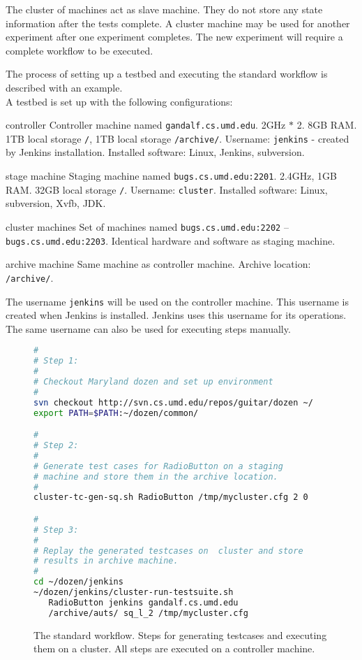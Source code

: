 The cluster of machines act as slave machine. They do not store any state information after the tests complete. A cluster machine may be used for another experiment after one experiment completes. The new experiment will require a complete workflow to be executed.

The process of setting up a testbed and executing the standard workflow is described with an example.\\

\noindent A testbed is set up with the following configurations:\\

\begin{smalldescription}
   \item [controller] Controller machine named \texttt{gandalf.cs.umd.edu}. 2GHz $*$ 2. 8GB RAM. 1TB local storage \texttt{/}, 1TB local storage \texttt{/archive/}. Username: \texttt{jenkins} - created by Jenkins installation. Installed software: Linux, Jenkins, subversion.

   \item [stage machine] Staging machine named \texttt{bugs.cs.umd.edu:2201}. 2.4GHz, 1GB RAM. 32GB local storage \texttt{/}. Username: \texttt{cluster}. Installed software: Linux, subversion, Xvfb, JDK.

   \item [cluster machines] Set of machines named \texttt{bugs.cs.umd.edu:2202} -- \texttt{bugs.cs.umd.edu:2203}. Identical hardware and software as staging machine.

   \item [archive machine] Same machine as controller machine. Archive location: \texttt{/archive/}.\\

\end{smalldescription}


The username \texttt{jenkins} will be used on the controller machine. This username is created when Jenkins is installed. Jenkins uses this username for its operations. The same username can also be used for executing steps manually.

\begin{figure}
\scriptsize{
\begin{lstlisting}[language=sh]
#
# Step 1:
#
# Checkout Maryland dozen and set up environment
#
svn checkout http://svn.cs.umd.edu/repos/guitar/dozen ~/
export PATH=$PATH:~/dozen/common/

#
# Step 2:
#
# Generate test cases for RadioButton on a staging
# machine and store them in the archive location.
#
cluster-tc-gen-sq.sh RadioButton /tmp/mycluster.cfg 2 0

#
# Step 3:
#
# Replay the generated testcases on  cluster and store
# results in archive machine.
# 
cd ~/dozen/jenkins
~/dozen/jenkins/cluster-run-testsuite.sh
   RadioButton jenkins gandalf.cs.umd.edu
   /archive/auts/ sq_l_2 /tmp/mycluster.cfg

\end{lstlisting}
}
\caption{The standard workflow. Steps for generating testcases and executing them on a cluster. All steps are executed on a controller machine.}
\label{fig:standardworkflow}
\end{figure}

